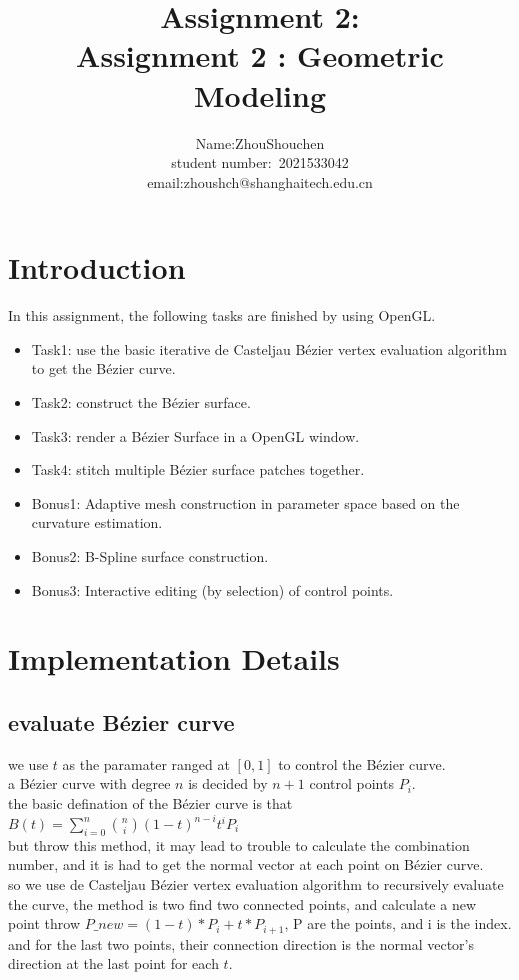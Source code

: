 \documentclass[acmtog]{acmart}
\title{Assignment 2:\\ {Assignment 2 : Geometric Modeling}}
\author{Name:\quad ZhouShouchen  \\ student number:\ 2021533042
\\email:\quad zhoushch@shanghaitech.edu.cn}
\begin{document}
\maketitle

\vspace*{2 ex}

\section{Introduction}
In this assignment, the following tasks are finished by using OpenGL.
\begin{itemize}
\item Task1: use the basic iterative de Casteljau Bézier vertex evaluation algorithm to get the Bézier curve.
\item Task2: construct the Bézier surface.
\item Task3: render a Bézier Surface in a OpenGL window.
\item Task4: stitch multiple Bézier surface patches together.
\item Bonus1: Adaptive mesh construction in parameter space based on the curvature estimation.
\item Bonus2: B-Spline surface construction. 
\item Bonus3: Interactive editing (by selection) of control points.

\end{itemize}
\section{Implementation Details}

\subsection{evaluate Bézier curve}
we use $t$ as the paramater ranged at $[0,1]$ to control the Bézier curve.\\
a Bézier curve with degree $n$ is decided by $n+1$ control points $P_i$.\\
the basic defination of the Bézier curve is that \\$B(t)=\sum_{i=0}^n \binom{n}{i}(1-t)^{n-i}t^iP_i$\\
but throw this method, it may lead to trouble to calculate the combination number, and it is had to get the normal vector at each point on Bézier curve.\\
so we use de Casteljau Bézier vertex evaluation algorithm to recursively evaluate the curve,
the method is two find two connected points, and calculate a new point throw $P\_new=(1-t)*P_i+t*P_{i+1}$,
P are the points, and i is the index.\\
and for the last two points, their connection direction is the normal vector's direction at the last point for each $t$.
\end{document}
